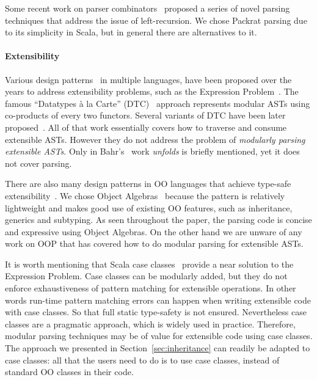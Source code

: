 Some recent work on parser
combinators~\cite{Ford2002,Might2011,Frost2008} proposed a series of
novel parsing techniques that address the issue of
left-recursion. We chose Packrat parsing due to its simplicity in Scala,
but in general there are alternatives to it.

\paragraph{Extensibility} Various design patterns~\cite{gamma1995design} in multiple
languages, have been proposed over the years to address extensibility
problems, such as the Expression Problem~\cite{wadler1998expression}.
The famous ``Datatypes \`a
la Carte'' (DTC)~\cite{swierstra2008data} approach represents modular ASTs using co-products
of every two functors. Several variants of DTC have been later proposed~\cite{Bahr2011,Bahr2014,Oliveira2015}.
All of that work essentially covers how to traverse and
consume extensible ASTs. However they do not
address the problem of \emph{modularly
parsing extensible ASTs}. Only in Bahr's~\cite{Bahr2011} work \emph{unfolds} is briefly mentioned,
yet it does not cover parsing.

There are also many design patterns in OO languages that achieve
type-safe extensibility~\cite{torgersen2004expression,odersky2005independently,oliveira2009modular,Oliveira:2012,wang2016expression}. We chose Object Algebras~\cite{Oliveira:2012} because the pattern is
relatively lightweight and makes good use of existing OO features,
such as inheritance, generics and subtyping. As seen throughout the paper,
the parsing code is concise and expressive using Object Algebras.
On the other hand we are unware of any work on OOP
that has covered how to do modular parsing for extensible ASTs.

It is worth mentioning that Scala case classes~\cite{emir2007matching} provide a near
solution to the Expression Problem. Case classes can be
modularly added, but they do not enforce
exhaustiveness of pattern matching for extensible operations. In other
words run-time pattern matching errors can happen when writing extensible code with case classes. So that full static type-safety is not ensured. Nevertheless case classes are a pragmatic approach, which is
widely used in practice. Therefore, modular parsing techniques may be
of value for extensible code using case classes.  The approach we
presented in Section~\ref{sec:inheritance} can readily be adapted to case classes:
all that the users need to do is to use case classes, instead of
standard OO classes in their code.


